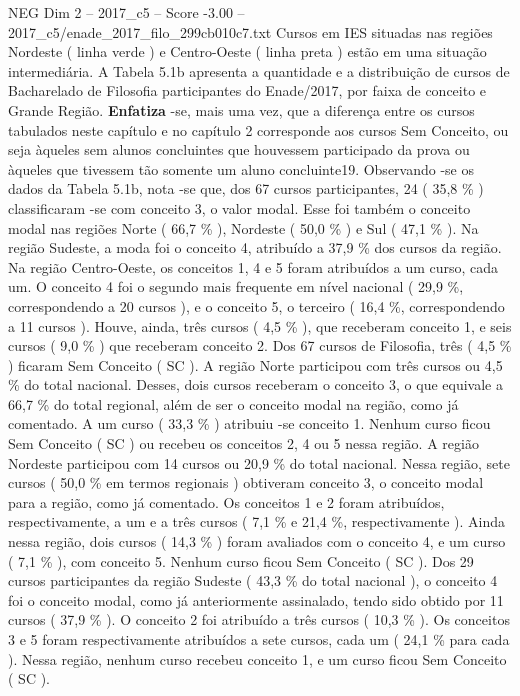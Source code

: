 \begin{textsample}{NEG Dim 2 – 2017\_c5 – Score -3.00 – 2017\_c5/enade\_2017\_filo\_299cb010c7.txt}
Cursos em IES situadas nas regiões Nordeste ( linha verde ) e Centro-Oeste ( linha preta ) estão em uma situação intermediária.
A Tabela 5.1b apresenta a quantidade e a distribuição de cursos de Bacharelado de Filosofia participantes do Enade/2017, por faixa de conceito e Grande Região. \textbf{Enfatiza} -se, mais uma vez, que a diferença entre os cursos tabulados neste capítulo e no capítulo 2 corresponde aos cursos Sem Conceito, ou seja àqueles sem alunos concluintes que houvessem participado da prova ou àqueles que tivessem tão somente um aluno concluinte19.
Observando -se os dados da Tabela 5.1b, nota -se que, dos 67 cursos participantes, 24 ( 35,8 \% ) classificaram -se com conceito 3, o valor modal.
Esse foi também o conceito modal nas regiões Norte ( 66,7 \% ), Nordeste ( 50,0 \% ) e Sul ( 47,1 \% ).
Na região Sudeste, a moda foi o conceito 4, atribuído a 37,9 \% dos cursos da região.
Na região Centro-Oeste, os conceitos 1, 4 e 5 foram atribuídos a um curso, cada um.
O conceito 4 foi o segundo mais frequente em nível nacional ( 29,9 \%, correspondendo a 20 cursos ), e o conceito 5, o terceiro ( 16,4 \%, correspondendo a 11 cursos ).
Houve, ainda, três cursos ( 4,5 \% ), que receberam conceito 1, e seis cursos ( 9,0 \% ) que receberam conceito 2.
Dos 67 cursos de Filosofia, três ( 4,5 \% ) ficaram Sem Conceito ( SC ).
A região Norte participou com três cursos ou 4,5 \% do total nacional.
Desses, dois cursos receberam o conceito 3, o que equivale a 66,7 \% do total regional, além de ser o conceito modal na região, como já comentado.
A um curso ( 33,3 \% ) atribuiu -se conceito 1.
Nenhum curso ficou Sem Conceito ( SC ) ou recebeu os conceitos 2, 4 ou 5 nessa região.
A região Nordeste participou com 14 cursos ou 20,9 \% do total nacional.
Nessa região, sete cursos ( 50,0 \% em termos regionais ) obtiveram conceito 3, o conceito modal para a região, como já comentado.
Os conceitos 1 e 2 foram atribuídos, respectivamente, a um e a três cursos ( 7,1 \% e 21,4 \%, respectivamente ).
Ainda nessa região, dois cursos ( 14,3 \% ) foram avaliados com o conceito 4, e um curso ( 7,1 \% ), com conceito 5.
Nenhum curso ficou Sem Conceito ( SC ).
Dos 29 cursos participantes da região Sudeste ( 43,3 \% do total nacional ), o conceito 4 foi o conceito modal, como já anteriormente assinalado, tendo sido obtido por 11 cursos ( 37,9 \% ).
O conceito 2 foi atribuído a três cursos ( 10,3 \% ).
Os conceitos 3 e 5 foram respectivamente atribuídos a sete cursos, cada um ( 24,1 \% para cada ).
Nessa região, nenhum curso recebeu conceito 1, e um curso ficou Sem Conceito ( SC ).

\end{textsample}
